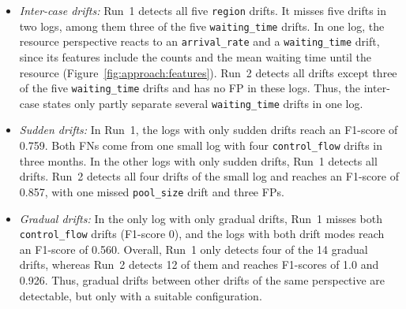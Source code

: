 \begin{itemize}
	\item \emph{Inter-case drifts:} \label{sec:eval:rheon:multi:inter} Run~1 detects all five \texttt{region} drifts. It misses five drifts in two logs, among them three of the five \texttt{waiting\_time} drifts. In one log, the resource perspective reacts to an \texttt{arrival\_rate} and a \texttt{waiting\_time} drift, since its features include the counts and the mean waiting time until the resource (Figure~\ref{fig:approach:features}). Run~2 detects all drifts except three of the five \texttt{waiting\_time} drifts and has no FP in these logs. Thus, the inter-case states only partly separate several \texttt{waiting\_time} drifts in one log.
	\item \emph{Sudden drifts:} \label{sec:eval:rheon:multi:sudden} In Run~1, the logs with only sudden drifts reach an F1-score of 0.759. Both FNs come from one small log with four \texttt{control\_flow} drifts in three months. In the other logs with only sudden drifts, Run~1 detects all drifts. Run~2 detects all four drifts of the small log and reaches an F1-score of 0.857, with one missed \texttt{pool\_size} drift and three FPs.
	\item \emph{Gradual drifts:} \label{sec:eval:rheon:multi:gradual} In the only log with only gradual drifts, Run~1 misses both \texttt{control\_flow} drifts (F1-score 0), and the logs with both drift modes reach an F1-score of 0.560. Overall, Run~1 only detects four of the 14 gradual drifts, whereas Run~2 detects 12 of them and reaches F1-scores of 1.0 and 0.926. Thus, gradual drifts between other drifts of the same perspective are detectable, but only with a suitable configuration.
\end{itemize}

